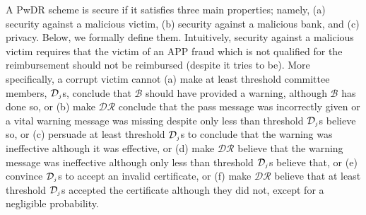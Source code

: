 A PwDR scheme is  secure if it satisfies three main properties; namely, (a) security against a malicious victim, (b) security against a malicious bank, and (c) privacy. Below, we formally define  them. Intuitively, security against a malicious victim requires that the victim of an APP fraud which is not qualified for the reimbursement should not be reimbursed  (despite  it tries to be). More specifically, a corrupt victim cannot (a) make at least threshold committee members, $\mathcal{D}_{\scriptscriptstyle j}$s,  conclude that $\mathcal{B}$ should have provided a warning, although $\mathcal{B}$ has done so, or (b) make $\mathcal{DR}$ conclude that   the pass message was incorrectly given or a vital warning message was missing despite only less than threshold  $\mathcal{D}_{\scriptscriptstyle j}$s  believe so, or (c) persuade at least threshold $\mathcal{D}_{\scriptscriptstyle j}$s to  conclude that the warning was ineffective although it was effective, or (d)  make $\mathcal{DR}$ believe that the warning message was ineffective although only less than threshold $\mathcal{D}_{\scriptscriptstyle j}$s   believe that, or (e)  convince  $\mathcal{D}_{\scriptscriptstyle j}$s to accept an invalid certificate, or  (f) make $\mathcal{DR}$ believe that at least  threshold $\mathcal{D}_{\scriptscriptstyle j}$s accepted the certificate  although they did not, except for a negligible probability. 









